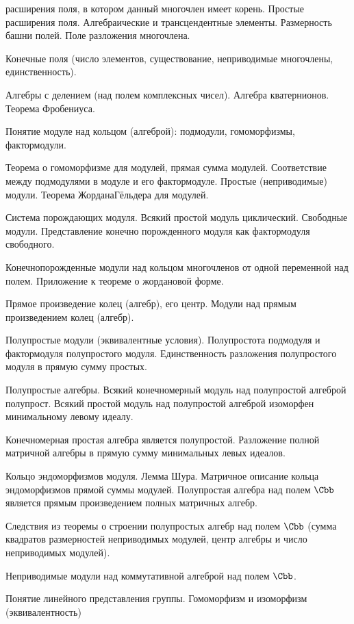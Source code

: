 \documentclass[a4paper]{article}
\begin{document}
\begin{nums}{-3.5}
расширения поля, в котором данный многочлен имеет корень. Простые расширения поля.
Алгебраические и трансцендентные элементы. Размерность башни полей.
Поле разложения многочлена.
\item Конечные поля (число элементов, существование, неприводимые многочлены, единственность).
\item Алгебры с делением (над полем комплексных чисел). Алгебра кватернионов. Теорема Фробениуса.
\item Понятие модуле над кольцом (алгеброй): подмодули, гомоморфизмы, фактормодули.
\item Теорема о гомоморфизме для модулей, прямая сумма модулей. Соответствие между подмодулями в модуле и его фактормодуле.
Простые (неприводимые) модули. Теорема Жордана\ч Гёльдера для модулей.
\item Система порождающих модуля. Всякий простой модуль циклический. Свободные модули.
Представление конечно порожденного модуля как фактормодуля свободного.
\item Конечнопорожденные модули над кольцом многочленов от одной переменной над полем.
Приложение к теореме о жордановой форме.
\item Прямое произведение колец (алгебр), его центр. Модули над прямым произведением колец (алгебр).
\item Полупростые модули (эквивалентные условия). Полупростота подмодуля и фактормодуля полупростого модуля.
Единственность разложения полупростого модуля в прямую сумму простых.
\item Полупростые алгебры. Всякий конечномерный модуль над полупростой алгеброй полупрост. Всякий простой модуль над полупростой алгеброй изоморфен минимальному левому идеалу.
\item Конечномерная простая алгебра является полупростой. Разложение полной матричной алгебры в прямую сумму минимальных левых идеалов.
\item Кольцо эндоморфизмов модуля. Лемма Шура. Матричное описание кольца эндоморфизмов прямой суммы модулей.
Полупростая алгебра над полем $\Cbb$ является прямым произведением полных матричных алгебр.
\item Следствия из теоремы о строении полупростых алгебр над полем $\Cbb$ (сумма квадратов размерностей неприводимых модулей, центр алгебры и число неприводимых модулей).
\item Неприводимые модули над коммутативной алгеброй над полем $\Cbb$.
\item Понятие линейного представления группы. Гомоморфизм и изоморфизм (эквивалентность)

\end{nums}
\end{document}

